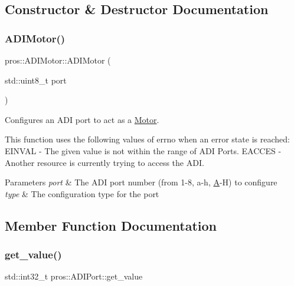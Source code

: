 \subsection{Constructor \& Destructor Documentation}
\mbox{\label{classpros_1_1ADIMotor_afd2da0e8c53a8bc0c999d5232242069a}} 
\subsubsection{\texorpdfstring{ADIMotor()}{ADIMotor()}}
{\footnotesize\ttfamily pros\+::\+A\+D\+I\+Motor\+::\+A\+D\+I\+Motor (\begin{DoxyParamCaption}\item[{std\+::uint8\+\_\+t}]{port }\end{DoxyParamCaption})}



Configures an A\+DI port to act as a \mbox{\hyperlink{classpros_1_1Motor}{Motor}}. 

This function uses the following values of errno when an error state is reached\+: E\+I\+N\+V\+AL -\/ The given value is not within the range of A\+DI Ports. E\+A\+C\+C\+ES -\/ Another resource is currently trying to access the A\+DI.


\begin{DoxyParams}{Parameters}
{\em port} & The A\+DI port number (from 1-\/8, \textquotesingle{}a\textquotesingle{}-\/\textquotesingle{}h\textquotesingle{}, \textquotesingle{}\mbox{\hyperlink{structA}{A}}\textquotesingle{}-\/\textquotesingle{}H\textquotesingle{}) to configure \\
\hline
{\em type} & The configuration type for the port \\
\hline
\end{DoxyParams}


\subsection{Member Function Documentation}
\mbox{\label{classpros_1_1ADIMotor_ac79b5fd3ce67ae6ffc4b1fbbb306e997}} 
\subsubsection{\texorpdfstring{get\_value()}{get\_value()}}
{\footnotesize\ttfamily std\+::int32\+\_\+t pros\+::\+A\+D\+I\+Port\+::get\+\_\+value}



